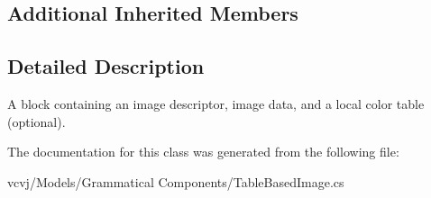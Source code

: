 \subsection*{Additional Inherited Members}


\subsection{Detailed Description}
A block containing an image descriptor, image data, and a local color table (optional). 



The documentation for this class was generated from the following file\+:\begin{DoxyCompactItemize}
\item 
vcvj/\+Models/\+Grammatical Components/Table\+Based\+Image.\+cs\end{DoxyCompactItemize}
